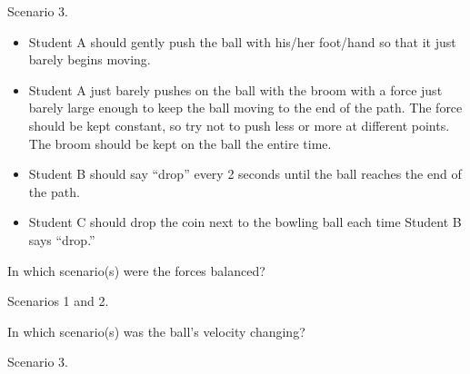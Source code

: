 \documentclass[../main-physics-problems.tex]{subfiles}
\begin{document}
\begin{questions}
\question 
Scenario 3.

\begin{itemize}[itemsep=0pt,topsep=0pt]
    \item Student A should gently push the ball with his/her foot/hand so that it just barely begins moving.
    \item Student A just barely pushes on the ball with the broom with a force just barely large enough to keep the ball moving to the end of the path. The force should be kept constant, so try not to push less or more at different points.  The broom should be kept on the ball the entire time.
    \item Student B should say ``drop'' every 2 seconds until the ball reaches the end of the path.
    \item Student C should drop the coin next to the bowling ball each time Student B says ``drop.''
\end{itemize}

\medskip


\question
In which scenario(s) were the forces balanced?

\begin{solution}
    Scenarios 1 and 2.
\end{solution}

\question
In which scenario(s) was the ball's velocity changing?

\begin{solution}
    Scenario 3.
\end{solution}


\end{questions}
\end{document}
